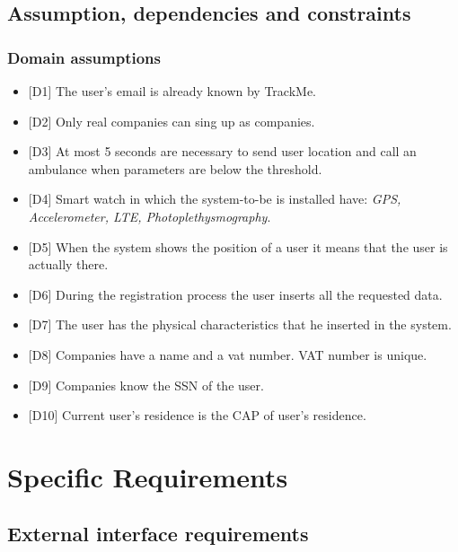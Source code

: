 \documentclass{article}
\begin{document}
\subsection{Assumption, dependencies and constraints}
\subsubsection{Domain assumptions}
\begin{itemize}
	\item {[D1]} The user's email is already known by TrackMe.
	\item {[D2]} Only real companies can sing up as companies.
	\item {[D3]}  At most 5 seconds are necessary to send user location and call an ambulance when parameters are below the threshold.
	\item {[D4]} Smart watch in which the system-to-be is installed have: \emph{GPS, Accelerometer, LTE, Photoplethysmography}.
	\item {[D5]} When the system shows the position of a user it means that the user is
actually there.
	\item {[D6]} During the registration process the user inserts all the requested data.
	\item {[D7]} The user has the physical characteristics that he inserted in the system.
	\item {[D8]} Companies have a name and a vat number. VAT number is unique.
	\item {[D9]} Companies know the SSN of the user.  
	\item {[D10]} Current user's residence is the CAP of user's residence. 
\end{itemize}\newpage
\section{Specific Requirements}
\subsection{External interface requirements}
\end{document}
